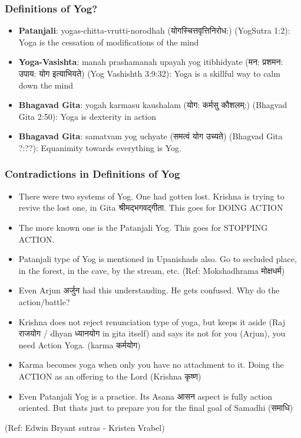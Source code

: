 \begin{frame}[fragile]\frametitle{Definitions of Yog?}

	\begin{itemize}
	\item \textbf{Patanjali}: yogas-chitta-vrutti-norodhah (योगस्चित्तवृत्तिनिरोध:) (YogSutra 1:2): Yoga is the cessation of modifications of the mind
	\item \textbf{Yoga-Vasishta}: manah prashamanah upayah yog itibhidyate (मन: प्रशमन: उपाय: योग इत्याभियते) (Yog Vashishth 3:9:32): Yoga is a skillful way to calm down the mind
	\item \textbf{Bhagavad Gita}: yogah karmasu kaushalam (योग: कर्मसु कौशलम्:) (Bhagvad Gita 2:50): Yoga is dexterity in action
	\item \textbf{Bhagavad Gita}: samatvam yog uchyate (समत्वं योग उच्यते) (Bhagvad Gita ?:??): Equanimity towards everything is Yog.	
	\end{itemize}

\end{frame}

\begin{frame}[fragile]\frametitle{Contradictions in Definitions of Yog}

	\begin{itemize}
	\item There were two systems of Yog. One had gotten lost. Krishna is trying to revive the lost one, in Gita श्रीमद्भगवद्गीता. This goes for DOING ACTION
	\item The more known one is the Patanjali Yog. This goes for STOPPING ACTION.
	\item Patanjali type of Yog is mentioned in Upanishads also. Go to secluded place, in the forest, in the cave, by the stream, etc. (Ref: Mokshadhrama मोक्षधर्म)
	\item Even Arjun अर्जुन had this understanding. He gets confused. Why do the action/battle?
	\item Krishna does not reject renunciation type of yoga, but keeps it aside (Raj राजयोग / dhyan ध्यानयोग in gita itself) and says its not for you (Arjun), you need Action Yoga. (karma कर्मयोग)
	\item Karma becomes yoga when only you have no attachment to it. Doing the ACTION as an offering to the Lord (Krishna कृष्ण)
	\item Even Patanjali Yog is a practice. Its Asana आसन aspect is fully action oriented. But thats just to prepare you for the final goal of Samadhi (समाधि)
	\end{itemize}

\tiny{(Ref: Edwin Bryant sutras - Kristen Vrabel)}


\end{frame}


